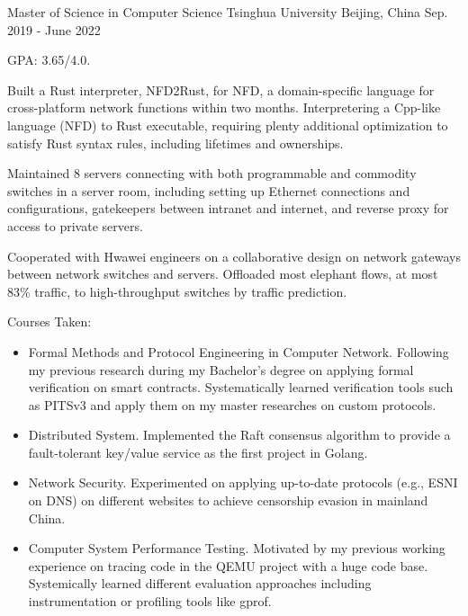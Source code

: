 
\vspace{-2mm}

\begin{cventries}

  
\cventry
  {Master of Science in Computer Science} %
  {Tsinghua University} %
  {Beijing, China} %
  {Sep. 2019 - June 2022} %
  {
    \begin{cvitems} %
      \item {GPA: 3.65/4.0.}
      \item {Built a Rust interpreter, NFD2Rust, for NFD, a domain-specific language for cross-platform network functions within two months. 
      Interpretering a Cpp-like language (NFD) to Rust executable, requiring plenty additional optimization to satisfy Rust syntax rules, including lifetimes and ownerships.
      }
      \item{Maintained 8 servers connecting with both programmable and commodity switches in a server room, including setting up Ethernet connections and configurations, gatekeepers between intranet and internet, 
      and reverse proxy for access to private servers.
      }
      \item{Cooperated with Hwawei engineers on a collaborative design on network gateways between network switches and servers. Offloaded most elephant flows, 
      at most 83\% traffic, to high-throughput switches by traffic prediction.}
      \item{Courses Taken:}
      \begin{itemize}
        \item{Formal Methods and Protocol Engineering in Computer Network.} Following my previous research during my Bachelor's degree on applying formal 
        verification on smart contracts. Systematically learned verification tools such as PITSv3 and apply them on my master researches on custom protocols.
        \item{Distributed System.} Implemented the Raft consensus algorithm to provide a fault-tolerant key/value service as the first project in Golang.
        \item{Network Security.} Experimented on applying up-to-date protocols (e.g., ESNI on DNS) on different websites to achieve censorship evasion 
        in mainland China.
        \item{Computer System Performance Testing.} Motivated by my previous working experience on tracing code in the QEMU project with a huge code base.
        Systemically learned different evaluation approaches including instrumentation or profiling tools like gprof.
			\end{itemize}
    \end{cvitems}
  }


\end{cventries}
